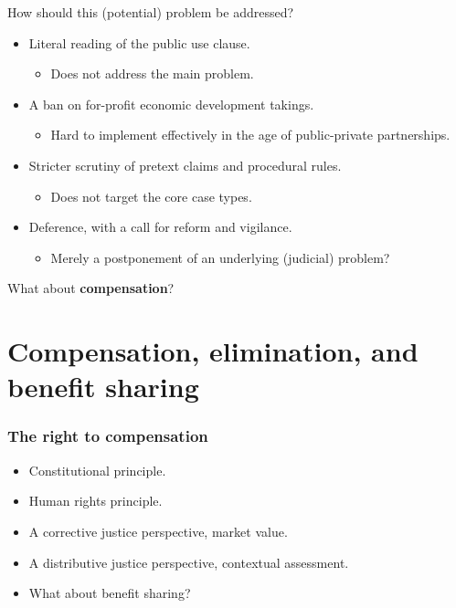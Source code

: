 \documentclass{beamer}
\begin{document}
\begin{frame}
How should this (potential) problem be addressed? \pause
\begin{itemize}
\item Literal reading of the public use clause.
\pause \begin{itemize}
\item Does not address the main problem.
\end{itemize}
\pause
\item A ban on for-profit economic development takings.
\pause
\begin{itemize}
\item Hard to implement effectively in the age of public-private partnerships.
\end{itemize}
\pause \item Stricter scrutiny of pretext claims and procedural rules.
\pause 
\begin{itemize}
\item Does not target the core case types.
\end{itemize}
\pause \item Deference, with a call for reform and vigilance.
\pause
\begin{itemize}
\item Merely a postponement of an underlying (judicial) problem?
\end{itemize}
\end{itemize}
\pause What about {\bf compensation}?
\end{frame}


\section{Compensation, elimination, and benefit sharing}

\begin{frame}
\frametitle{The right to compensation}
\begin{itemize}
\item Constitutional principle.
\item Human rights principle.
\item A corrective justice perspective, market value.
\item A distributive justice perspective, contextual assessment.
\item What about benefit sharing?
\end{itemize}
\end{frame}
\end{document}
